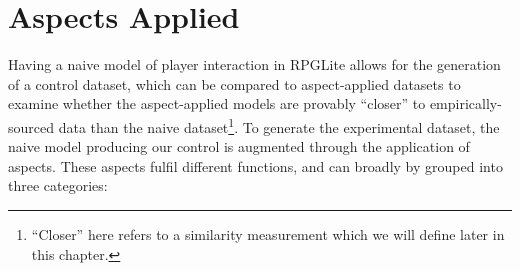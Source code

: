 \section{Aspects Applied}\label{sec:optimisation_with_aspects_aspectsdeveloped}








Having a naive model of player interaction in RPGLite allows for the generation
of a control dataset, which can be compared to aspect-applied datasets to
examine whether the aspect-applied models are provably ``closer'' to
empirically-sourced data than the naive dataset\footnote{``Closer'' here refers
to a similarity measurement which we will define later in this chapter.}. To
generate the experimental dataset, the naive model producing our control is
augmented through the application of aspects. These aspects fulfil different
functions, and can broadly by grouped into three categories:

